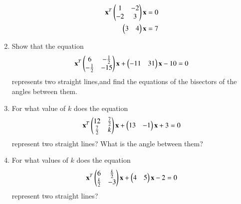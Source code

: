 \begin{enumerate}[label=\arabic*.,ref=\thesubsection.\theenumi]
\begin{align}
\mathbf{x}^T
\begin{pmatrix}1 & -{2}\\-{2} & 3\end{pmatrix} 
\mathbf{x} = 0
\\
\begin{pmatrix}3&4\end{pmatrix}\mathbf{x}=7
\end{align}
\renewcommand{\theequation}{\theenumi}
\item Show that the equation 
\begin{align}
    \mathbf{x}^T\begin{pmatrix}6&-\frac{1}{2}\\-\frac{1}{2}&-15\end{pmatrix}\mathbf{x}+\begin{pmatrix}-11& 31\end{pmatrix}\mathbf{x}-10=0\label{eq:solutions/2/6/22/eq:1}
\end{align}
represents two straight lines,and find the equations of the bisectors of the angles between them.
%
\\
\solution

\item For what value of $k$ does the equation
\begin{align}
\mathbf{x}^T
\begin{pmatrix}12 & \frac{7}{2}\\\frac{7}{2} & k\end{pmatrix} 
\mathbf{x} 
+\begin{pmatrix}13&-1\end{pmatrix}\mathbf{x}+3=0
\end{align}
represent two straight lines? What is the angle between them?
\item For what values of $k$ does the equation
\begin{align}
\mathbf{x}^T
\begin{pmatrix}6 & \frac{k}{2}\\\frac{k}{2} & -3\end{pmatrix} 
\mathbf{x} 
+\begin{pmatrix}4&5\end{pmatrix}\mathbf{x}-2=0
\end{align}
represent two straight lines?
\end{enumerate}
